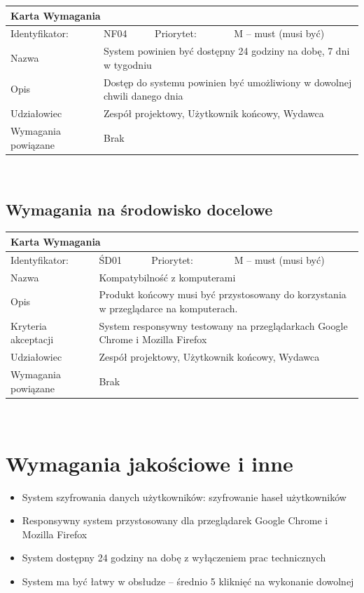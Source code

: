 \documentclass[a4paper,11pt]{report}
\begin{document}
		\newline
		\vspace*{0,2 cm}
		\newline
		\begin{tabular}{|p{3cm}|p{2cm}|p{2cm}|p{6cm}|}
		\hline
		\multicolumn{4}{|p{12 cm}|}{Karta Wymagania}\\
		\hline
		Identyfikator: & NF04 & Priorytet: & M – must (musi być)\\
		\hline
		Nazwa & \multicolumn{3}{|p{10 cm}|}{System powinien być dostępny 24 godziny na dobę, 7 dni w tygodniu}\\
		\hline
		Opis & \multicolumn{3}{|p{10 cm}|}{Dostęp do systemu powinien być umożliwiony w dowolnej chwili danego dnia}\\
		\hline
		Udziałowiec & \multicolumn{3}{|p{10 cm}|}{Zespół projektowy, Użytkownik końcowy, Wydawca}\\
		\hline
		Wymagania powiązane & \multicolumn{3}{|p{10 cm}|}{Brak}\\
		\hline
		\end{tabular}\\
	\subsection {Wymagania na środowisko docelowe}
	\begin{tabular}{|p{3cm}|p{2cm}|p{2cm}|p{6cm}|}
		\hline
		\multicolumn{4}{|p{12 cm}|}{Karta Wymagania}\\
		\hline
		Identyfikator: & ŚD01 & Priorytet: & M – must (musi być)\\
		\hline
		Nazwa & \multicolumn{3}{|p{10 cm}|}{Kompatybilność z komputerami}\\
		\hline
		Opis & \multicolumn{3}{|p{10 cm}|}{Produkt końcowy musi być przystosowany do korzystania w przeglądarce na komputerach.}\\
		\hline
		Kryteria akceptacji & \multicolumn{3}{|p{10 cm}|}{System responsywny testowany na przeglądarkach Google Chrome i Mozilla Firefox}\\
		\hline
		Udziałowiec & \multicolumn{3}{|p{10 cm}|}{Zespół projektowy, Użytkownik końcowy, Wydawca}\\
		\hline
		Wymagania powiązane & \multicolumn{3}{|p{10 cm}|}{Brak}\\
		\hline
		\end{tabular}\\
	\section {Wymagania jakościowe i inne}
	\begin{itemize}
		\item System szyfrowania danych użytkowników: szyfrowanie haseł użytkowników
		\item Responsywny system przystosowany dla przeglądarek Google Chrome i Mozilla Firefox
		\item System dostępny 24 godziny na dobę z wyłączeniem prac technicznych
		\item System ma być łatwy w obsłudze – średnio 5 kliknięć na wykonanie dowolnej 
	\end{itemize}
\end{document}

